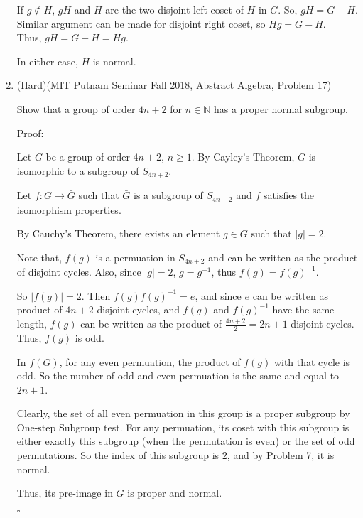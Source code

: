 \documentclass[12pt]{article}
\begin{document}
\begin{enumerate}
        If $g \not \in H$, $gH$ and $H$ are the two disjoint left coset of $H$ in $G$. So, $gH = G - H$. Similar argument can be made for disjoint right coset, so $Hg = G - H$. \\Thus, $gH = G - H = Hg$.

        In either case, $H$ is normal.
        \pagebreak

    \item (Hard)(MIT Putnam Seminar Fall 2018, Abstract Algebra, Problem 17)

        Show that a group of order $4n+2$ for $n \in \mathbb{N}$ has a proper normal subgroup.

        Proof:

        Let $G$ be a group of order $4n+2$, $n \geq 1$. By Cayley's Theorem, $G$ is isomorphic to a subgroup of $S_{4n+2}$.

        Let $f: G \to \bar G$ such that $\bar G$ is a subgroup of $S_{4n+2}$ and $f$ satisfies the isomorphism properties.

        By Cauchy's Theorem, there exists an element $g \in G$ such that $|g| = 2$.

        Note that, $f(g)$ is a permuation in $S_{4n+2}$ and can be written as the product of disjoint cycles. Also, since $|g| = 2$, $g = g^{-1}$, thus $f(g) = f(g)^{-1}$.

        So $|f(g)| = 2$. Then $f(g)f(g)^{-1} = e$, and since $e$ can be written as product of $4n+2$ disjoint cycles, and $f(g)$ and $f(g)^{-1}$ have the same length, $f(g)$ can be written as the product of $\frac{4n+2}{2} = 2n+1$ disjoint cycles. Thus, $f(g)$ is odd.

        In $f(G)$, for any even permuation, the product of $f(g)$ with that cycle is odd. So the number of odd and even permuation is the same and equal to $2n+1$.

        Clearly, the set of all even permuation in this group is a proper subgroup by One-step Subgroup test. For any permuation, its coset with this subgroup is either exactly this subgroup (when the permutation is even) or the set of odd permutations. So the index of this subgroup is $2$, and by Problem 7, it is normal.

        Thus, its pre-image in $G$ is proper and normal.

        $\square$
        \pagebreak

\end{enumerate}
\end{document}
